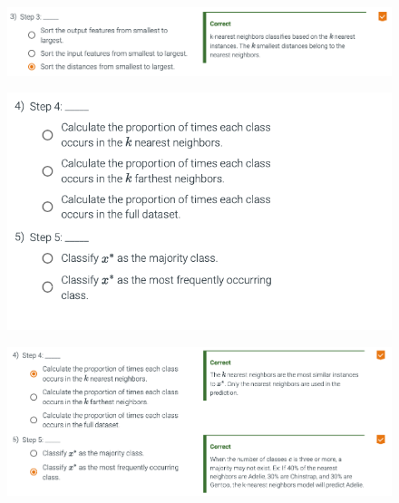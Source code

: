 \documentclass[8pt,dvipsnames]{beamer}
\begin{document}
\begin{frame}
	\begin{figure}[ht]
		\centering
		\includegraphics[width=\linewidth]{imgs/knn_19.png}
	\end{figure}
\end{frame}

\begin{frame}
	\begin{figure}[ht]
		\centering
		\includegraphics[width=\linewidth]{imgs/knn_20.png}
	\end{figure}
\end{frame}

\begin{frame}
	\begin{figure}[ht]
		\centering
		\includegraphics[width=\linewidth]{imgs/knn_21.png}
	\end{figure}
\end{frame}
\end{document}
